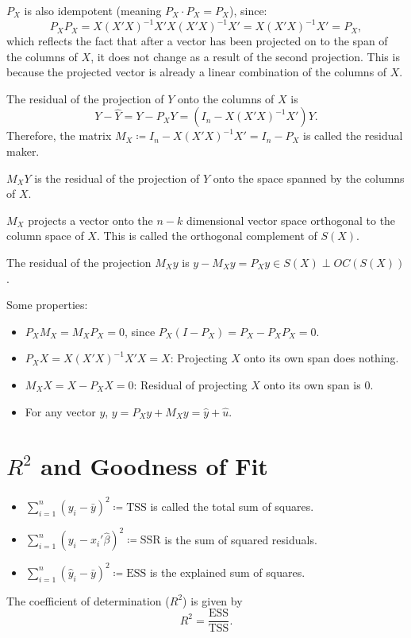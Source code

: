 \begin{remark}	$P_X$ is also idempotent (meaning $P_X\cdot P_X=P_X$), since:
	\[
		P_XP_X=X(X'X)^{-1}X'X(X'X)^{-1}X'=X(X'X)^{-1}X'=P_X,
	\]
	which reflects the fact that after a vector has been projected on to the span of the columns of $X$, it does not change as a result of the second projection. This is because the projected vector is already a linear combination of the columns of $X$.
\end{remark}

\begin{definition}
	The residual of the projection of $Y$ onto the columns of $X$ is
	\[
		Y-\hat Y=Y-P_XY=(I_n-X(X'X)^{-1}X')Y.
	\]
	Therefore, the matrix $M_X\coloneqq I_n-X(X'X)^{-1}X' = I_n - P_X$ is called the residual maker.

	$M_XY$ is the residual of the projection of $Y$ onto the space spanned by the columns of $X$.
\end{definition}

\begin{proposition}
	$M_X$ projects a vector onto the $n-k$ dimensional vector space orthogonal to the column space of $X$. This is called the orthogonal complement of $S(X)$.

	The residual of the projection $M_X y$ is $y - M_X y = P_X y \in S(X) \perp OC(S(X))$.

	Some properties:
	\begin{itemize}
		\item $P_XM_X=M_XP_X=0$, since $P_X(I-P_X)=P_X-P_XP_X=0$.
		\item $P_XX=X(X'X)^{-1}X'X=X$: Projecting $X$ onto its own span does nothing.
		\item $M_XX=X-P_XX=0$: Residual of projecting $X$ onto its own span is $0$.
		\item For any vector $y$, $y=P_Xy+M_Xy=\hat y+\hat u$.
	\end{itemize}
\end{proposition}

\section{$R^2$ and Goodness of Fit}

\begin{definition}[$R^2$]
	\begin{itemize}
		\item $\sum_{i=1}^n(y_i-\bar y)^2\coloneqq\text{TSS}$ is called the total sum of squares.
		\item $\sum_{i=1}^n(y_i-x_i'\hat\beta)^2\coloneqq\text{SSR}$ is the sum of squared residuals.
		\item $\sum_{i=1}^n(\hat y_i-\bar y)^2\coloneqq\text{ESS}$ is the explained sum of squares.
	\end{itemize}
	The coefficient of determination ($R^2$) is given by
	\[
		R^2=\frac{\text{ESS}}{\text{TSS}}.
	\]
\end{definition}

